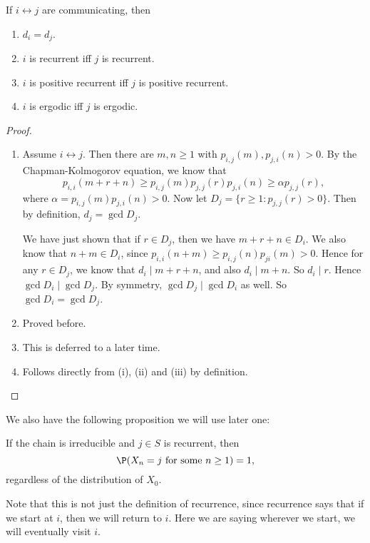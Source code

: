 \documentclass[a4paper]{article}
\begin{document}
\begin{thm}
  If $i \leftrightarrow j$ are communicating, then
  \begin{enumerate}
    \item $d_i = d_j$.
    \item $i$ is recurrent iff $j$ is recurrent.
    \item $i$ is positive recurrent iff $j$ is positive recurrent.
    \item $i$ is ergodic iff $j$ is ergodic.
  \end{enumerate}
\end{thm}

\begin{proof}\leavevmode
  \begin{enumerate}
    \item Assume $i \leftrightarrow j$. Then there are $m, n \geq 1$ with $p_{i, j}(m), p_{j, i}(n) > 0$. By the Chapman-Kolmogorov equation, we know that
      \[
        p_{i, i}(m + r + n) \geq p_{i, j}(m)p_{j, j}(r)p_{j, i}(n) \geq \alpha p_{j, j}(r),
      \]
      where $\alpha = p_{i, j}(m) p_{j, i}(n) > 0$. Now let $D_j = \{r \geq 1: p_{j, j}(r) > 0\}$. Then by definition, $d_j = \gcd D_j$.

      We have just shown that if $r \in D_j$, then we have $m + r + n \in D_i$. We also know that $n + m \in D_i$, since $p_{i, i}(n + m) \geq p_{i, j}(n)p_{ji}(m) > 0$. Hence for any $r \in D_j$, we know that $d_i \mid m + r + n$, and also $d_i \mid m + n$. So $d_i \mid r$. Hence $\gcd D_i \mid \gcd D_j$. By symmetry, $\gcd D_j \mid \gcd D_i$ as well. So $\gcd D_i = \gcd D_j$.
    \item Proved before.
    \item This is deferred to a later time.
    \item Follows directly from (i), (ii) and (iii) by definition.\qedhere
  \end{enumerate}
\end{proof}

We also have the following proposition we will use later one:
\begin{prop}
  If the chain is irreducible and $j \in S$ is recurrent, then
  \[
    \P(X_n = j\text{ for some }n \geq 1) = 1,
  \]
  regardless of the distribution of $X_0$.
\end{prop}
Note that this is not just the definition of recurrence, since recurrence says that if we start at $i$, then we will return to $i$. Here we are saying wherever we start, we will eventually visit $i$.
\end{document}
